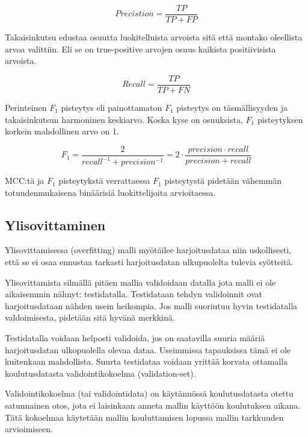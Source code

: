 \documentclass[finnish,twoside,openright]{HYgraduMLDS}
\begin{document}
\begin{equation} \label{eq:precision}
    Precistion = \frac{TP}{TP + FP}
\end{equation}


Takaisinkutsu edustaa osuutta luokitelluista arvoista sitä että montako oleellista arvoa valittiin. Eli se on true-positive arvojen osuus kaikista positiivisista arvoista.

\begin{equation} \label{eq:recall}
    Recall = \frac{TP}{TP + FN}
\end{equation}


Perinteinen $F_1$ pisteytys eli painottamaton $F_1$ pisteytys on täsmällisyyden ja takaisinkutsun harmoninen keskiarvo\cite{sasaki2007truth}. Koska kyse on osuuksista, $F_1$ pisteytyksen korkein mahdollinen arvo on 1.

\begin{equation} \label{eq:f1}
    F_1 = \frac{2}{recall^{-1} + precision^{-1}} = 2 \cdot \frac{precision \cdot recall}{precision + recall}
\end{equation}


MCC:tä ja $F_1$ pisteytykstä verrattaessa $F_1$ pisteytystä pidetään vähemmän totuudenmukaisena binäärisiä luokittelijoita arvioitaessa\cite{chicco2020advantages}.


\subsection{Ylisovittaminen}

Ylisovittamisessa (overfitting) malli myötäilee harjoitusdataa niin uskollisesti, että se ei osaa ennustaa tarkasti harjoitusdatan ulkupuolelta tulevia syötteitä.

Ylisovittamista silmällä pitäen mallia validoidaan datalla jota malli ei ole aikaisemmin nähnyt: testidatalla. Testidataan tehdyn validoinnit ovat harjoitusdataan nähden usein heikompia. Jos malli suoriutuu hyvin testidatalla valdoimisesta, pidetään sitä hyvänä merkkinä.

Testidatalla voidaan helposti validoida, jos on saatavilla suuria määriä harjoitusdatan ulkopuolella olevaa dataa. Useimmissa tapauksissa tämä ei ole kuitenkaan mahdollista. Suurta testidataa voidaan yrittää korvata ottamalla koulutusdatasta validointikokoelma (validation-set). 

Validointikokoelma (tai validointidata) on käytännössä koulutusdatasta otettu satunnainen otos, jota ei laisinkaan anneta mallin käyttöön koulutuksen aikana. Tätä kokoelmaa käytetään mallin kouluttamisen lopussa mallin tarkkuuden arvioimiseen. 
\end{document}

